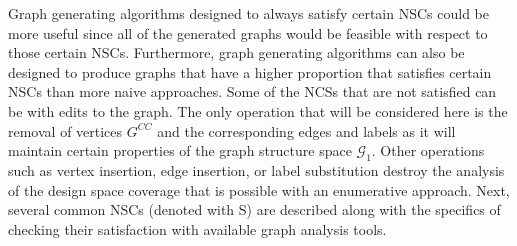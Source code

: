 Graph generating algorithms designed to always satisfy certain NSCs could be more useful since all of the generated graphs would be feasible with respect to those certain NSCs.
Furthermore, graph generating algorithms can also be designed to produce graphs that have a higher proportion that satisfies certain NSCs than more naive approaches.
Some of the NCSs that are not satisfied can be with edits to the graph.
The only operation that will be considered here is the removal of vertices $G^{CC}$ and the corresponding edges and labels as it will maintain certain properties of the graph structure space $\mathcal{G}_1$.
Other operations such as vertex insertion, edge insertion, or label substitution destroy the analysis of the design space coverage that is possible with an enumerative \mypm{} approach.
Next, several common NSCs (denoted with \gls{S}) are described along with the specifics of checking their satisfaction with available graph analysis tools.

